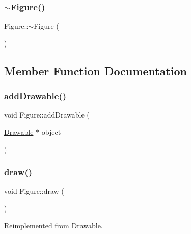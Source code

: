 \mbox{\label{classFigure_af155c20558330034441de6a19d94f4a7}} 
\subsubsection{\texorpdfstring{$\sim$\+Figure()}{~Figure()}}
{\footnotesize\ttfamily Figure\+::$\sim$\+Figure (\begin{DoxyParamCaption}{ }\end{DoxyParamCaption})}



\subsection{Member Function Documentation}
\mbox{\label{classFigure_ac4960ce394966b1171c8ea49fb694cef}} 
\subsubsection{\texorpdfstring{add\+Drawable()}{addDrawable()}}
{\footnotesize\ttfamily void Figure\+::add\+Drawable (\begin{DoxyParamCaption}\item[{\hyperlink{classDrawable}{Drawable} $\ast$}]{object }\end{DoxyParamCaption})}

\mbox{\label{classFigure_afb62fad838fc6f7ece4f88b318b5862a}} 
\subsubsection{\texorpdfstring{draw()}{draw()}}
{\footnotesize\ttfamily void Figure\+::draw (\begin{DoxyParamCaption}{ }\end{DoxyParamCaption})\hspace{0.3cm}{\ttfamily [virtual]}}



Reimplemented from \hyperlink{classDrawable_a1231e00fe6022c2ff0e8d61fd23c5c23}{Drawable}.

\mbox{\label{classFigure_a7c99f033d2de6e1148bfd972610ad61b}} 
